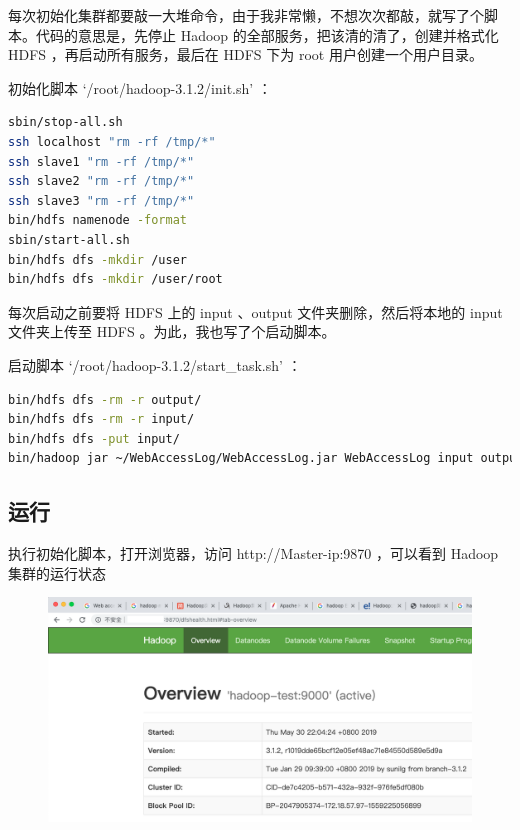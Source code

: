 \documentclass{article}
\begin{document}
每次初始化集群都要敲一大堆命令，由于我非常懒，不想次次都敲，就写了个脚本。代码的意思是，先停止 Hadoop  的全部服务，把该清的清了，创建并格式化 HDFS ，再启动所有服务，最后在 HDFS 下为 root 用户创建一个用户目录。

初始化脚本 `/root/hadoop-3.1.2/init.sh' ：

\begin{lstlisting}[language=bash]
sbin/stop-all.sh
ssh localhost "rm -rf /tmp/*"
ssh slave1 "rm -rf /tmp/*"
ssh slave2 "rm -rf /tmp/*"
ssh slave3 "rm -rf /tmp/*"
bin/hdfs namenode -format
sbin/start-all.sh
bin/hdfs dfs -mkdir /user
bin/hdfs dfs -mkdir /user/root
\end{lstlisting}

每次启动之前要将 HDFS 上的 input 、output 文件夹删除，然后将本地的 input 文件夹上传至 HDFS 。为此，我也写了个启动脚本。

启动脚本 `/root/hadoop-3.1.2/start\_task.sh' ：

\begin{lstlisting}[language=bash]
bin/hdfs dfs -rm -r output/
bin/hdfs dfs -rm -r input/
bin/hdfs dfs -put input/
bin/hadoop jar ~/WebAccessLog/WebAccessLog.jar WebAccessLog input output
\end{lstlisting}

\subsection{运行}

执行初始化脚本，打开浏览器，访问 http://Master-ip:9870 ，可以看到 Hadoop 集群的运行状态

\begin{figure}[!ht]
\centering
\includegraphics[scale=0.35]{image/16.png}
\end{figure}

\newpage 
\end{document}

